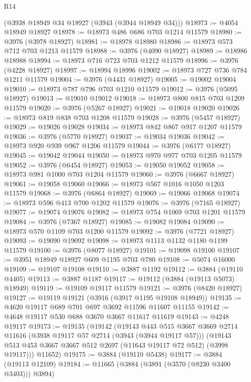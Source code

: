 \begin{lexlean}{R14}
\begin{coremodule}
    (@3938 @18949 @34 @18927 (@3943 (@3944 @18949 @34)))
@18973 := @4054 @18949 @18927
@18978 := @18973 @486 @686 @703 @1214 @11579
@18980 := @3976 (@3978 @18927)
@18981 := @18978 @18980
@18986 := @18973 @573 @712 @703 @1213 @11579
@18988 := @3976 (@4090 @18927)
@18989 := @18986 @18988
@18994 := @18973 @716 @723 @703 @1212 @11579
@18996 := @3976 (@4228 @18927)
@18997 := @18994 @18996
@19002 := @18973 @727 @736 @784 @1211 @11579
@19004 := @3976 (@4431 @18927)
@19005 := @19002 @19004
@19010 := @18973 @787 @796 @703 @1210 @11579
@19012 := @3976 (@5095 @18927)
@19013 := @19010 @19012
@19018 := @18973 @800 @815 @703 @1209 @11579
@19020 := @3976 (@5267 @18927)
@19021 := @19018 @19020
@19026 := @18973 @819 @838 @703 @1208 @11579
@19028 := @3976 (@5457 @18927)
@19029 := @19026 @19028
@19034 := @18973 @842 @867 @917 @1207 @11579
@19036 := @3976 (@5770 @18927)
@19037 := @19034 @19036
@19042 := @18973 @920 @939 @967 @1206 @11579
@19044 := @3976 (@6177 @18927)
@19045 := @19042 @19044
@19050 := @18973 @970 @977 @703 @1205 @11579
@19052 := @3976 (@6454 @18927)
@19053 := @19050 @19052
@19058 := @18973 @981 @1000 @703 @1204 @11579
@19060 := @3976 (@6667 @18927)
@19061 := @19058 @19060
@19066 := @18973 @567 @1016 @1050 @1203 @11579
@19068 := @3976 (@6864 @18927)
@19069 := @19066 @19068
@19074 := @18973 @596 @413 @700 @1202 @11579
@19076 := @3976 (@7165 @18927)
@19077 := @19074 @19076
@19082 := @18973 @754 @1069 @703 @1201 @11579
@19084 := @3976 (@7367 @18927)
@19085 := @19082 @19084
@19090 := @18973 @570 @1109 @703 @1200 @11579
@19092 := @3976 (@7721 @18927)
@19093 := @19090 @19092
@19098 := @18973 @1113 @1132 @1180 @1199 @11579
@19100 := @3976 (@8077 @18927)
@19101 := @19098 @19100
@19107 := @3951 @18949 @18927 @609 @1195 @703 @780
@19108 := @5074 @16000
@19109 := @19107 @19108
@19110 := @3887 @1192
@19112 := @3884 (@19110 @4405)
@19113 := @3887 @1187
@19117 := @19112 (@3884 (@19113 @5073) @18949)
@19119 := @19109 @19117 @11579
@19121 := @3976 (@8420 @18927)
@19127 := @19119 @19121 (@3916 (@3917 @1195 @19108 @18949))
@19135 := @4620 @19117 @689 @701 @697 @3692 @11596 @11607 @11155
@19142 := @4648 @19117 @530 @688 @3670 @3667 @11617 @11619
@19143 := @4248 @19117
@19173 := @19135
    (@19142
      (@19143
        @443
        @515
        @3667
        @3669
        @2714
        @11616
        (@3938 @19117 @57 @2714 (@3943 (@3944 @19117 @57)))
        (@19143 @513 @453 @3667 @3667 @512 @2697 (@11643 @19117 @72 @512) (@3998 @19117)))
      @11652)
@19175 := @3884 (@19110 @5438)
@19177 := @3884 (@19113 @12109)
@19184 := @11665 (@3884 (@3891 (@3570 (@8230 @3400 @3403))) @3894)

\end{coremodule}
\end{lexlean}
